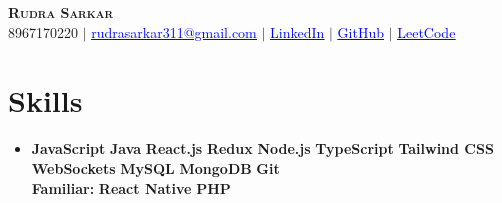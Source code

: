 \documentclass[letterpaper,11pt]{article}
\newcommand{\resumeSubHeadingListStart}{\begin{itemize}[leftmargin=0.15in, label={}]}
\begin{document}

\begin{center}
    \textbf{\Huge \scshape Rudra Sarkar} \\ \vspace{5pt}
    \small 8967170220 $|$ \href{mailto:rudrasarkar311@gmail.com}{\textcolor{blue}{\underline{rudrasarkar311@gmail.com}}} $|$
    \href{https://www.linkedin.com/in/rudra-sarkar-853385225}{\textcolor{blue}{\underline{LinkedIn}}} $|$
    \href{https://github.com/RudraSarkar5}{\textcolor{blue}{\underline{GitHub}}} $|$
    \href{https://leetcode.com/Rudra_sarkar5}{\textcolor{blue}{\underline{LeetCode}}}

\end{center}


\section{Skills}
\begin{itemize}
    \item \textbf{JavaScript} \textbullet{} \textbf{Java} \textbullet{} \textbf{React.js} \textbullet{} \textbf{Redux} \textbullet{} \textbf{Node.js} \textbullet{} \textbf{TypeScript} \textbullet{} \textbf{Tailwind CSS} \textbullet{} \textbf{WebSockets} \textbullet{} \textbf{MySQL} \textbullet{} \textbf{MongoDB} \textbullet{} \textbf{Git} \\
   \textbf{Familiar:} \textbullet{} \textbf{React Native} \textbullet{} \textbf{PHP}
\end{itemize}










\end{document}
